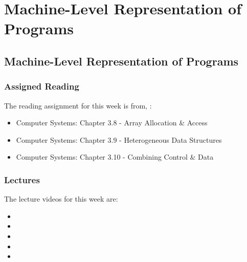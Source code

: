 \clearpage

\renewcommand{\ChapTitle}{Machine-Level Representation of Programs}
\renewcommand{\SectionTitle}{Machine-Level Representation of Programs}

\chapter{\ChapTitle}
\section{\SectionTitle}

\subsection{Assigned Reading}

The reading assignment for this week is from, \Textbook:

\begin{itemize}
    \item Computer Systems: Chapter 3.8 - Array Allocation \& Access
    \item Computer Systems: Chapter 3.9 - Heterogeneous Data Structures
    \item Computer Systems: Chapter 3.10 - Combining Control & Data
\end{itemize}

\subsection{Lectures}

The lecture videos for this week are:

\begin{itemize}
    \item {}
    \item {}
    \item {}
    \item {}
    \item {}
\end{itemize}

